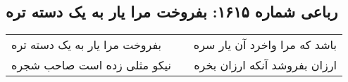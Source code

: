 \begin{center}
\section*{رباعی شماره ۱۶۱۵: بفروخت مرا یار به یک دسته تره}
\label{sec:1615}
\begin{longtable}{l p{0.5cm} r}
بفروخت مرا یار به یک دسته تره
&&
باشد که مرا واخرد آن یار سره
\\
نیکو مثلی زده است صاحب شجره
&&
ارزان بفروشد آنکه ارزان بخره
\\
\end{longtable}
\end{center}
